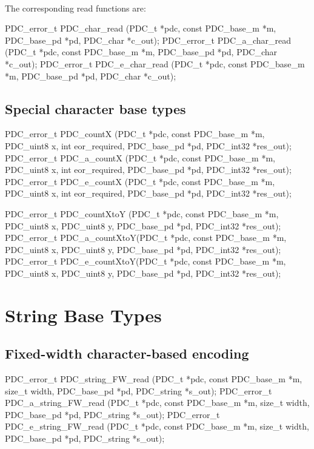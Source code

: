 \aedBegin{}
\aedEnd{}
\\[1ex]
The corresponding read functions are:
\begin{tinycodeaux}{\leftmargin=0in}
PDC_error_t PDC_char_read   (PDC_t *pdc, const PDC_base_m *m, PDC_base_pd *pd, PDC_char *c_out);
PDC_error_t PDC_a_char_read (PDC_t *pdc, const PDC_base_m *m, PDC_base_pd *pd, PDC_char *c_out);
PDC_error_t PDC_e_char_read (PDC_t *pdc, const PDC_base_m *m, PDC_base_pd *pd, PDC_char *c_out);
\end{tinycodeaux}

\subsection{Special character base types}

\aedBegin{}
\aedEnd{}

\begin{tinycodeaux}{\leftmargin=0in}
PDC_error_t PDC_countX     (PDC_t *pdc, const PDC_base_m *m, PDC_uint8 x, int eor_required,
		            PDC_base_pd *pd, PDC_int32 *res_out);
PDC_error_t PDC_a_countX   (PDC_t *pdc, const PDC_base_m *m, PDC_uint8 x, int eor_required,
			    PDC_base_pd *pd, PDC_int32 *res_out);
PDC_error_t PDC_e_countX   (PDC_t *pdc, const PDC_base_m *m, PDC_uint8 x, int eor_required,
			    PDC_base_pd *pd, PDC_int32 *res_out);

PDC_error_t PDC_countXtoY  (PDC_t *pdc, const PDC_base_m *m, PDC_uint8 x, PDC_uint8 y,
		            PDC_base_pd *pd, PDC_int32 *res_out);
PDC_error_t PDC_a_countXtoY(PDC_t *pdc, const PDC_base_m *m, PDC_uint8 x, PDC_uint8 y,
			    PDC_base_pd *pd, PDC_int32 *res_out);
PDC_error_t PDC_e_countXtoY(PDC_t *pdc, const PDC_base_m *m, PDC_uint8 x, PDC_uint8 y,
			    PDC_base_pd *pd, PDC_int32 *res_out);
\end{tinycodeaux}

\section{String Base Types}

\subsection{Fixed-width character-based encoding}

\aedBegin{}
\aedEnd{}

\begin{tinycodeaux}{\leftmargin=0in}
PDC_error_t PDC_string_FW_read   (PDC_t *pdc, const PDC_base_m *m, size_t width,
				  PDC_base_pd *pd, PDC_string *s_out);
PDC_error_t PDC_a_string_FW_read (PDC_t *pdc, const PDC_base_m *m, size_t width,
				  PDC_base_pd *pd, PDC_string *s_out);
PDC_error_t PDC_e_string_FW_read (PDC_t *pdc, const PDC_base_m *m, size_t width,
				  PDC_base_pd *pd, PDC_string *s_out);
\end{tinycodeaux}

